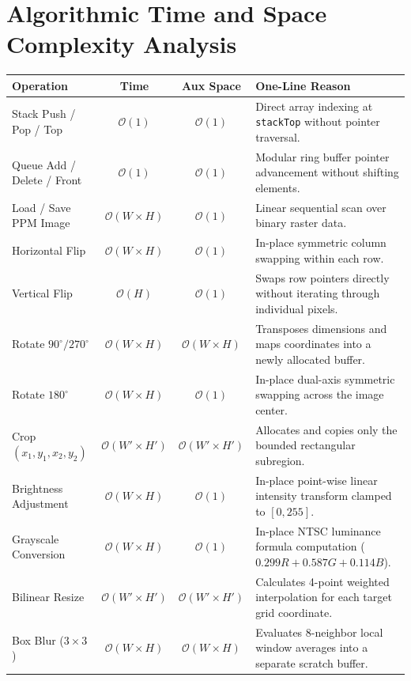 \documentclass[9.5pt,a4paper]{article}
\begin{document}
\section{Algorithmic Time and Space Complexity Analysis}
\begin{table}[h!]
\centering
\fontsize{7.5pt}{9.2pt}\selectfont
\begin{tabularx}{\textwidth}{l c c X}
\toprule
\textbf{Operation} & \textbf{Time} & \textbf{Aux Space} & \textbf{One-Line Reason} \\
\midrule
Stack Push / Pop / Top & $\mathcal{O}(1)$ & $\mathcal{O}(1)$ & Direct array indexing at \texttt{stackTop} without pointer traversal. \\
Queue Add / Delete / Front & $\mathcal{O}(1)$ & $\mathcal{O}(1)$ & Modular ring buffer pointer advancement without shifting elements. \\
Load / Save PPM Image & $\mathcal{O}(W \times H)$ & $\mathcal{O}(1)$ & Linear sequential scan over binary raster data. \\
Horizontal Flip & $\mathcal{O}(W \times H)$ & $\mathcal{O}(1)$ & In-place symmetric column swapping within each row. \\
Vertical Flip & $\mathcal{O}(H)$ & $\mathcal{O}(1)$ & Swaps row pointers directly without iterating through individual pixels. \\
Rotate $90^\circ / 270^\circ$ & $\mathcal{O}(W \times H)$ & $\mathcal{O}(W \times H)$ & Transposes dimensions and maps coordinates into a newly allocated buffer. \\
Rotate $180^\circ$ & $\mathcal{O}(W \times H)$ & $\mathcal{O}(1)$ & In-place dual-axis symmetric swapping across the image center. \\
Crop $(x_1, y_1, x_2, y_2)$ & $\mathcal{O}(W' \times H')$ & $\mathcal{O}(W' \times H')$ & Allocates and copies only the bounded rectangular subregion. \\
Brightness Adjustment & $\mathcal{O}(W \times H)$ & $\mathcal{O}(1)$ & In-place point-wise linear intensity transform clamped to $[0, 255]$. \\
Grayscale Conversion & $\mathcal{O}(W \times H)$ & $\mathcal{O}(1)$ & In-place NTSC luminance formula computation ($0.299R + 0.587G + 0.114B$). \\
Bilinear Resize & $\mathcal{O}(W' \times H')$ & $\mathcal{O}(W' \times H')$ & Calculates 4-point weighted interpolation for each target grid coordinate. \\
Box Blur ($3 \times 3$) & $\mathcal{O}(W \times H)$ & $\mathcal{O}(W \times H)$ & Evaluates 8-neighbor local window averages into a separate scratch buffer. \\

\end{tabularx}
\end{table}
\end{document}
